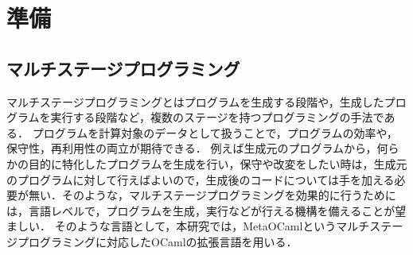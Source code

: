 \documentclass[10pt,a4j,xcolor=dvipsnames,twocolumn]{jarticle}
\theoremstyle{definition}
\begin{document}

\section{準備}
\subsection{マルチステージプログラミング}
マルチステージプログラミングとはプログラムを生成する段階や，生成したプログラムを実行する段階など，複数のステージを持つプログラミングの手法である．
プログラムを計算対象のデータとして扱うことで，プログラムの効率や，保守性，再利用性の両立が期待できる．
例えば生成元のプログラムから，何らかの目的に特化したプログラムを生成を行い，保守や改変をしたい時は，生成元のプログラムに対して行えばよいので，生成後のコードについては手を加える必要が無い．そのような，マルチステージプログラミングを効果的に行うためには，言語レベルで，プログラムを生成，実行などが行える機構を備えることが望ましい．
そのような言語として，本研究では，MetaOCamlというマルチステージプログラミングに対応したOCamlの拡張言語を用いる．

\end{document}
